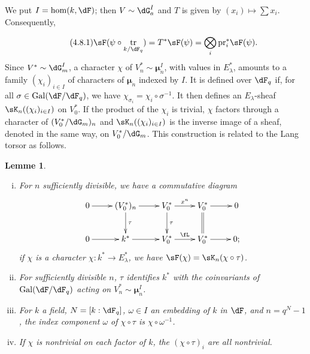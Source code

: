 \documentclass[oneside]{book}
\DeclareMathOperator{\gal}{Gal}
\DeclareMathOperator{\tr}{tr}
\newcommand{\dmu}{{\bm\mu}}
\newcounter{char}
\newcommand{\pr}{\mathrm{pr}} %
\theoremstyle{sga-source}
\theoremstyle{sga-source-dash}
\theoremstyle{sga-source-dotdash}
\theoremstyle{sga-source-number-note-dash}
\theoremstyle{sga-source-note-number-dotdash}
\theoremstyle{sga-source-example-dotdash}
\theoremstyle{sga-source-inline-number}
\theoremstyle{sga-source-bare-number}
\theoremstyle{sga-source}
\newtheorem{lemma_}[subsection]{Lemme}
\newcommand{\PrintPage}[1]{}\newcommand{\MathPage}[1]{}\newcommand{\PrintCite}[2]{#1}\newcommand{\var}[3]{#2}
\begin{document}
We put $I=\hom(k,\dF)$; then $V\sim \dG_a^I$ and $T$ is given by 
$(x_i)\mapsto \sum x_i$. Consequently, 
\PrintPage{200}
\begin{equation*}\tag{4.8.1}\label{VI:eq:4-8-1}
  \sF(\psi\circ \tr_{k/\dF_q}) = T^\ast \sF(\psi) = \bigotimes_i \pr_i^\ast \sF(\psi) \text{.} 
\end{equation*}
Since $V^\ast\sim \dG_m^I$, a character $\chi$ of $V_n^\ast\sim \dmu_n^I$, 
with values in $E_\lambda^\ast$, amounts to a family 
$(\chi_i)_{i\in I}$ of characters of $\dmu_n$ indexed by $I$. It is 
defined over $\dF_q$ if, for all $\sigma\in \gal(\dF/\dF_q)$, we have 
$\chi_{\sigma_i} = \chi_i\circ \sigma^{-1}$. It then defines an $E_\lambda$-sheaf $\sK_n((\chi_i)_{i\in I})$ on $V_0^\ast$. If the product 
of the $\chi_i$ is trivial, $\chi$ factors through a character of 
$(V_0^\ast/\dG_m)_n$ and $\sK_n((\chi_i)_{i\in I})$ is the inverse image 
of a sheaf, denoted in the same way, on $V_0^\ast/\dG_m$. This construction 
is related to the Lang torsor as follows. 





\begin{lemma_}\label{VI:4-9}
\begin{enumerate}[(i)]
  \item For $n$ sufficiently divisible, we have a commutative diagram 
    \[\xymatrix{
      0 \ar[r] 
        & (V_0^\ast)_n \ar[r] \ar[d]^-\tau 
        & V_0^\ast \ar[r]^-{x^n} \ar[d]^-\tau 
        & V_0^\ast \ar[r] \ar@{=}[d] 
        & 0 \\
      0 \ar[r] 
        & k^\ast \ar[r] 
        & V_0^\ast \ar[r]^-\fL 
        & V_0^\ast \ar[r] 
        & 0 \text{;} 
    }\]
    if $\chi$ is a character $\chi:k^\ast \to E_\lambda^\ast$, we have 
    $\sF(\chi) = \sK_n(\chi\circ\tau)$. 
  \item For sufficiently divisible $n$, $\tau$ identifies $k^\ast$ with the coinvariants 
    of $\var{\gal(\bar\dF/F)}{\gal(\dF/\dF_q)}{S45-SOL-0819}$ acting on $V_n^\ast\sim \dmu_n^I$. 
  \item For $k$ a field, $N=[k:\dF_q]$, $\omega\in I$ an embedding of $k$ 
    in $\dF$, and $n=q^N-1$, the index component $\omega$ of 
    $\chi\circ\tau$ is $\chi\circ \omega^{-1}$. 
  \item If $\chi$ is nontrivial on each factor of $k$, the 
    $(\chi\circ \tau)_i$ are all nontrivial. 
\end{enumerate}
\end{lemma_}
\end{document}
